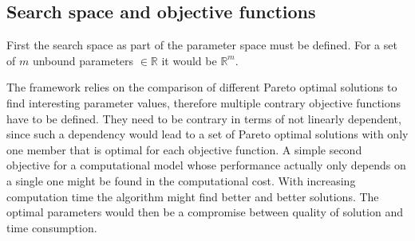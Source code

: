 \documentclass[12pt,twoside]{article}
\theoremstyle{plain}
\theoremstyle{definition}
\theoremstyle{remark}
\begin{document}
\subsection{Search space and objective functions}
First the search space as part of the parameter space must be defined. For a set of $m$ unbound parameters $\in \mathbb{R}$ it would be $\mathbb{R}^m$. 

The framework relies on the comparison of different Pareto optimal solutions to find interesting parameter values, therefore multiple contrary objective functions have to be defined.
They need to be contrary in terms of not linearly dependent, since such a dependency would lead to a set of Pareto optimal solutions with only one member that is optimal for each objective function.
A simple second objective for a computational model whose performance actually only depends on a single one might be found in the computational cost.
With increasing computation time the algorithm might find better and better solutions. The optimal parameters would then be a compromise between quality of solution and time consumption.
\end{document}
